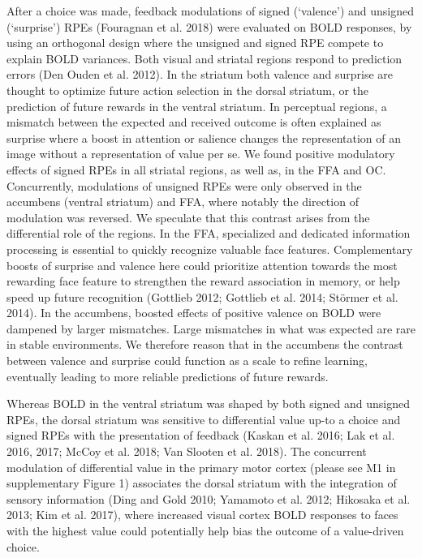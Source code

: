 \documentclass[]{article}
\begin{document}
After a choice was made, feedback modulations of signed (`valence') and
unsigned (`surprise') RPEs (Fouragnan et al. 2018) were evaluated on
BOLD responses, by using an orthogonal design where the unsigned and
signed RPE compete to explain BOLD variances. Both visual and striatal
regions respond to prediction errors (Den Ouden et al. 2012). In the
striatum both valence and surprise are thought to optimize future action
selection in the dorsal striatum, or the prediction of future rewards in
the ventral striatum. In perceptual regions, a mismatch between the
expected and received outcome is often explained as surprise where a
boost in attention or salience changes the representation of an image
without a representation of value per se. We found positive modulatory
effects of signed RPEs in all striatal regions, as well as, in the FFA
and OC. Concurrently, modulations of unsigned RPEs were only observed in
the accumbens (ventral striatum) and FFA, where notably the direction of
modulation was reversed. We speculate that this contrast arises from the
differential role of the regions. In the FFA, specialized and dedicated
information processing is essential to quickly recognize valuable face
features. Complementary boosts of surprise and valence here could
prioritize attention towards the most rewarding face feature to
strengthen the reward association in memory, or help speed up future
recognition (Gottlieb 2012; Gottlieb et al. 2014; Störmer et al. 2014).
In the accumbens, boosted effects of positive valence on BOLD were
dampened by larger mismatches. Large mismatches in what was expected are
rare in stable environments. We therefore reason that in the accumbens
the contrast between valence and surprise could function as a scale to
refine learning, eventually leading to more reliable predictions of
future rewards.

Whereas BOLD in the ventral striatum was shaped by both signed and
unsigned RPEs, the dorsal striatum was sensitive to differential value
up-to a choice and signed RPEs with the presentation of feedback (Kaskan
et al. 2016; Lak et al. 2016, 2017; McCoy et al. 2018; Van Slooten et
al. 2018). The concurrent modulation of differential value in the
primary motor cortex (please see M1 in supplementary Figure 1)
associates the dorsal striatum with the integration of sensory
information (Ding and Gold 2010; Yamamoto et al. 2012; Hikosaka et al.
2013; Kim et al. 2017), where increased visual cortex BOLD responses to
faces with the highest value could potentially help bias the outcome of
a value-driven choice.
\end{document}
